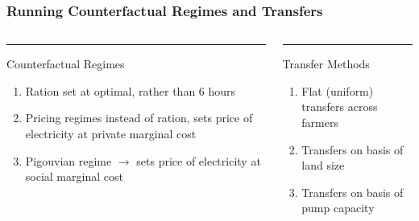 \documentclass[handout,aspectratio=169]{beamer} %
\begin{document}
\begin{frame}
    \frametitle{Running Counterfactual Regimes and Transfers}
    \label{counterfactuals}
    \begin{columns}[t]

        \begin{column}{0.48\textwidth}
        \color{BlueGreen}\rule{\linewidth}{4pt}
        Counterfactual Regimes
        \begin{enumerate}
            \item Ration set at optimal, rather than 6 hours
            \item Pricing regimes instead of ration, sets price of electricity at private marginal cost
            \item Pigouvian regime $\rightarrow$ sets price of electricity at social marginal cost
        \end{enumerate}
        \end{column}
        
        \begin{column}{0.48\textwidth}
        \color{RawSienna}\rule{\linewidth}{4pt}
        Transfer Methods
        \begin{enumerate}
            \item Flat (uniform) transfers across farmers
            \item Transfers on basis of land size
            \item Transfers on basis of pump capacity
        \end{enumerate}
        \end{column}
        
    \end{columns}

    \vfill
\end{frame}
\end{document}
